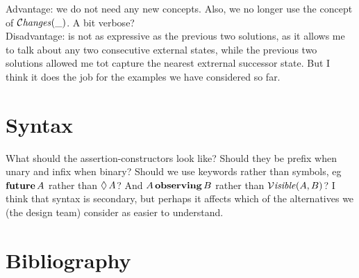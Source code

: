 \documentclass[acmsmall,screen]{acmart}
\begin{document}
\vspace{.3in}
\noindent
Advantage:  we do not need any new concepts. Also, we no longer use the concept of $\mathcal{C}\textrm{\textit{hanges}}(\_)$. A bit verbose?
\\
Disadvantage:  is not as expressive as the previous two solutions, as it allows me to talk about any two consecutive external states, while the previous two solutions allowed me tot capture the nearest extrernal successor state. But I think it does the job for the examples we have considered so far. 


\section{Syntax}

What should the assertion-constructors look like? Should they be prefix when unary and infix when binary?
Should we use keywords rather than symbols, eg ${\bf future} \,A$ rather than  $\lozenge\, A$? And
$A\, {\bf observing}\, B$ rather than $\mathcal{V}\textrm{\textit{isible}}(A,B)$? I think that syntax is secondary, but perhaps it affects which of the
alternatives we 
(the design team) consider as 
easier to understand.

\section*{Bibliography}
 
\end{document}
